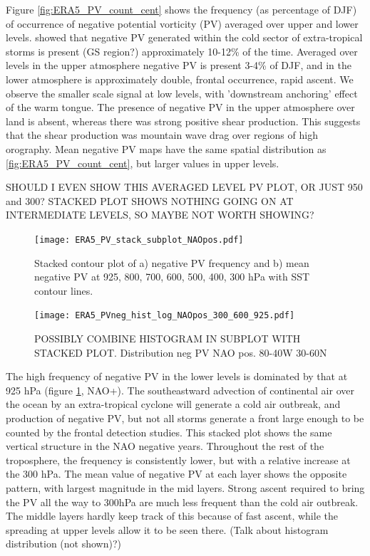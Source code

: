 Figure \ref{fig:ERA5_PV_count_cent} shows the frequency (as percentage of DJF) of occurrence of negative potential vorticity (PV) averaged over upper and lower levels. \citet{vanniere2016potential} showed that negative PV generated within the cold sector of extra-tropical storms is present (GS region?) approximately 10-12\% of the time. Averaged over levels in the upper atmosphere negative PV is present 3-4\% of DJF, and in the lower atmosphere is approximately double, frontal occurrence, rapid ascent. We observe the smaller scale signal at low levels, with 'downstream anchoring’ effect of the warm tongue. The presence of negative PV in the upper atmosphere over land is absent, whereas there was strong positive shear production. This suggests that the shear production was mountain wave drag over regions of high orography. Mean negative PV maps have the same spatial distribution as  \ref{fig:ERA5_PV_count_cent}, but larger values in upper levels.

SHOULD I EVEN SHOW THIS AVERAGED LEVEL PV PLOT, OR JUST 950 and 300? STACKED PLOT SHOWS NOTHING GOING ON AT INTERMEDIATE LEVELS, SO MAYBE NOT WORTH SHOWING?

\begin{figure}[h]
	\centering
	\texttt{[image: ERA5\_PV\_stack\_subplot\_NAOpos.pdf]}
	\caption{Stacked contour plot of a) negative PV frequency and b) mean negative PV at 925, 800, 700, 600, 500, 400, 300 hPa with SST contour lines.}
	\label{fig:ERA5_PV_stack}
\end{figure}

 \begin{figure}[h]
 	\centering
 	\texttt{[image: ERA5\_PVneg\_hist\_log\_NAOpos\_300\_600\_925.pdf]}
 	\caption{POSSIBLY COMBINE HISTOGRAM IN SUBPLOT WITH STACKED PLOT. Distribution neg PV NAO pos. 80-40W 30-60N}
 	\label{fig:ERA5_PV_dist_NAOpos}
 \end{figure}

The high frequency of negative PV in the lower levels is dominated by that at 925 hPa (figure \ref{fig:ERA5_PV_stack}, NAO+). The southeastward advection of continental air over the ocean by an extra-tropical cyclone will generate a cold air outbreak, and production of negative PV, but not all storms generate a front large enough to be counted by the frontal detection studies. This stacked plot shows the same vertical structure in the NAO negative years. Throughout the rest of the troposphere, the frequency is consistently lower, but with a relative increase at the 300 hPa. The mean value of negative PV at each layer shows the opposite pattern, with largest magnitude in the mid layers. Strong ascent required to bring the PV all the way to 300hPa are much less frequent than the cold air outbreak. The middle layers hardly keep track of this because of fast ascent, while the spreading at upper levels allow it to be seen there. (Talk about histogram distribution (not shown)?)

